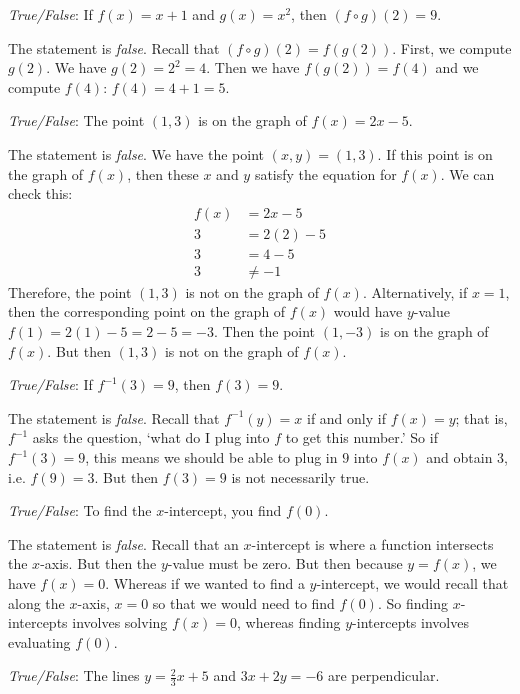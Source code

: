 \documentclass[11pt,letterpaper]{article}
\begin{document}
\quizsol \textit{True/False}: If $f(x)= x + 1$ and $g(x)= x^2$, then $(f \circ g)(2)= 9$. \pspace

\sol The statement is \textit{false}. Recall that $(f \circ g)(2)= f(g(2))$. First, we compute $g(2)$. We have $g(2)= 2^2= 4$. Then we have $f(g(2))= f(4)$ and we compute $f(4)$: $f(4)= 4 +1= 5$. \pvspace{1.5cm}



\newpage



\quizsol \textit{True/False}: The point $(1, 3)$ is on the graph of $f(x)= 2x - 5$. \pspace

\sol The statement is \textit{false}. We have the point $(x, y)= (1, 3)$. If this point is on the graph of $f(x)$, then these $x$ and $y$ satisfy the equation for $f(x)$. We can check this:
	\[
	\begin{aligned}
	f(x)&= 2x - 5 \\
	3&= 2(2) - 5 \\
	3&= 4 - 5 \\
	3&\neq -1
	\end{aligned}
	\]
Therefore, the point $(1, 3)$ is not on the graph of $f(x)$. Alternatively, if $x= 1$, then the corresponding point on the graph of $f(x)$ would have $y$-value $f(1)= 2(1) - 5= 2 - 5= -3$. Then the point $(1, -3)$ is on the graph of $f(x)$. But then $(1, 3)$ is not on the graph of $f(x)$. \pvspace{1.5cm}



\quizsol \textit{True/False}: If $f^{-1}(3)= 9$, then $f(3)= 9$. \pspace

\sol The statement is \textit{false}. Recall that $f^{-1}(y)= x$ if and only if $f(x)= y$; that is, $f^{-1}$ asks the question, `what do I plug into $f$ to get this number.' So if $f^{-1}(3)= 9$, this means we should be able to plug in $9$ into $f(x)$ and obtain $3$, i.e. $f(9)= 3$. But then $f(3)= 9$ is not necessarily true. \pvspace{1.5cm}



\quizsol \textit{True/False}: To find the $x$-intercept, you find $f(0)$. \pspace

\sol The statement is \textit{false}. Recall that an $x$-intercept is where a function intersects the $x$-axis. But then the $y$-value must be zero. But then because $y= f(x)$, we have $f(x)= 0$. Whereas if we wanted to find a $y$-intercept, we would recall that along the $x$-axis, $x= 0$ so that we would need to find $f(0)$. So finding $x$-intercepts involves solving $f(x)= 0$, whereas finding $y$-intercepts involves evaluating $f(0)$. \pvspace{1.5cm} 



\quizsol \textit{True/False}: The lines $y= \frac{2}{3}x + 5$ and $3x + 2y= -6$ are perpendicular. \pspace

\sol 
\end{document}
